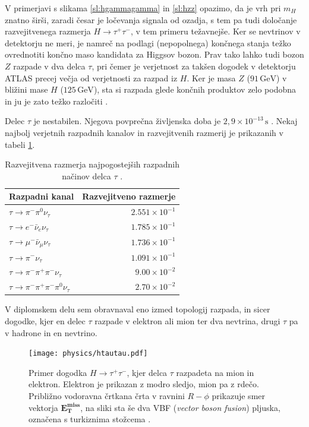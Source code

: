 \documentclass[11pt,a4paper,openany]{book}
\begin{document}
V primerjavi s slikama \ref{sl:hgammagamma} in \ref{sl:hzz} opazimo, da je vrh pri $m_H$ znatno širši, zaradi česar je ločevanja signala od ozadja, s tem pa tudi določanje razvejitvenega razmerja $H \rightarrow \tau^+\tau^-$, v tem primeru težavnejše. Ker se nevtrinov v detektorju ne meri, je namreč na podlagi (nepopolnega) končnega stanja težko ovrednotiti končno maso kandidata za Higgsov bozon. Prav tako lahko tudi bozon $Z$ razpade v dva delca $\tau$, pri čemer je verjetnost za takšen dogodek v detektorju ATLAS precej večja od verjetnosti za razpad iz $H$. Ker je masa $Z$ ($91\,\text{GeV}$) v bližini mase $H$ ($125\,\text{GeV}$), sta si razpada glede končnih produktov zelo podobna in ju je zato težko razločiti \cite{ChallengeDoc}.

Delec $\tau$ je nestabilen. Njegova povprečna življenska doba je $2,9 \times 10^{-13}\,\text{s}$ \cite{WikiTau}. Nekaj najbolj verjetnih razpadnih kanalov in razvejitvenih razmerij je prikazanih v tabeli \ref{tb:pdgtau}.

\begin{table}[ht]
	\centering
	\begin{tabular}{lr}
		\hline
		\textbf{Razpadni kanal} & \textbf{Razvejitveno razmerje} \\
		\hline
		$\tau \rightarrow \pi^-\pi^0\nu_\tau$ & $\num{2,551} \times 10^{-1}$ \\	
		$\tau \rightarrow e^-\bar{\nu}_e\nu_\tau$ & $\num{1,785} \times 10^{-1}$ \\
		$\tau \rightarrow \mu^-\bar{\nu}_\mu\nu_\tau$ & $\num{1,736} \times 10^{-1}$ \\
		$\tau \rightarrow \pi^-\nu_\tau$ & $\num{1,091} \times 10^{-1}$ \\
		$\tau \rightarrow \pi^-\pi^+\pi^-\nu_\tau$ & $\num{9,00} \times 10^{-2}$ \\
		$\tau \rightarrow \pi^-\pi^+\pi^-\pi^0\nu_\tau$ & $\num{2,70} \times 10^{-2}$ \\	\end{tabular}
	\caption{Razvejitvena razmerja najpogostejših razpadnih načinov delca $\tau$ \cite{PDGTau}.}
	\label{tb:pdgtau}
\end{table}

V diplomskem delu sem obravnaval eno izmed topologij razpada, in sicer dogodke, kjer en delec $\tau$ razpade v elektron ali mion ter dva nevtrina, drugi $\tau$ pa v hadrone in en nevtrino.

\begin{figure}[h]
	\texttt{[image: physics/htautau.pdf]}
	
	\caption{Primer dogodka $H \rightarrow \tau^+\tau^-$, kjer delca $\tau$ razpadeta na mion in elektron. Elektron je prikazan z modro sledjo, mion pa z rdečo. Približno vodoravna črtkana črta v ravnini $R-\phi$ prikazuje smer vektorja $\mathbf{E_T^{miss}}$, na sliki sta še dva VBF (\textit{vector boson fusion}) pljuska, označena s turkiznima stožcema \cite{atlas2015htautau}.  }
	\label{htautau}
\end{figure}
\end{document}

